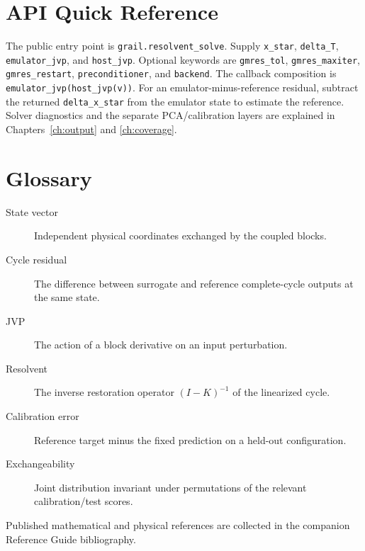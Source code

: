 \documentclass[11pt]{book}
\newcommand{\code}[1]{\texttt{#1}}
\begin{document}








\backmatter

\chapter*{API Quick Reference}
The public entry point is \code{grail.resolvent\_solve}. Supply
\code{x\_star}, \code{delta\_T}, \code{emulator\_jvp}, and
\code{host\_jvp}. Optional keywords are \code{gmres\_tol},
\code{gmres\_maxiter}, \code{gmres\_restart}, \code{preconditioner},
and \code{backend}. The callback composition is
\code{emulator\_jvp(host\_jvp(v))}.
For an emulator-minus-reference residual, subtract the returned
\code{delta\_x\_star} from the emulator state to estimate the reference.
Solver diagnostics and the separate PCA/calibration layers are explained in
Chapters~\ref{ch:output} and \ref{ch:coverage}.

\chapter*{Glossary}
\begin{description}
\item[State vector] Independent physical coordinates exchanged by the coupled blocks.
\item[Cycle residual] The difference between surrogate and reference complete-cycle outputs at the same state.
\item[JVP] The action of a block derivative on an input perturbation.
\item[Resolvent] The inverse restoration operator $(I-K)^{-1}$ of the linearized cycle.
\item[Calibration error] Reference target minus the fixed prediction on a held-out configuration.
\item[Exchangeability] Joint distribution invariant under permutations of the relevant calibration/test scores.
\end{description}
Published mathematical and physical references are collected in the companion
Reference Guide bibliography.
\end{document}
